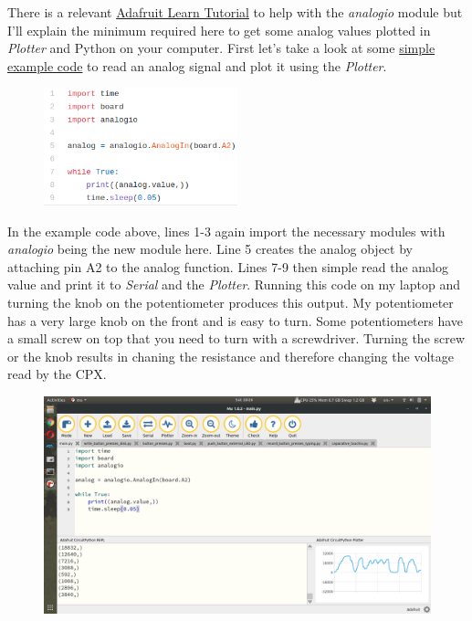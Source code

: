 There is a relevant \href{https://learn.adafruit.com/adafruit-circuit-playground-express/circuitpython-analog-in}{Adafruit Learn Tutorial} to help with the {\it analogio} module but I’ll explain the minimum required here to get some analog values plotted in {\it Plotter} and Python on your computer. First let’s take a look at some \href{https://github.com/cmontalvo251/Microcontrollers/blob/master/Circuit_Playground/CircuitPython/Analog/analog_simple.py}{simple example code} to read an analog signal and plot it using the {\it Plotter}.
\begin{figure}[H]
  \begin{center}
    \includegraphics[width=0.5\textwidth]{Figures/analogio.png}
  \end{center}
\end{figure}
In the example code above, lines 1-3 again import the necessary modules with {\it analogio} being the new module here. Line 5 creates the analog object by attaching pin A2 to the analog function. Lines 7-9 then simple read the analog value and print it to {\it Serial} and the {\it Plotter}. Running this code on my laptop and turning the knob on the potentiometer produces this output. My potentiometer has a very large knob on the front and is easy to turn. Some potentiometers have a small screw on top that you need to turn with a screwdriver. Turning the screw or the knob results in chaning the resistance and therefore changing the voltage read by the CPX.
\begin{figure}[H]
  \begin{center}
    \includegraphics[width=\textwidth]{Figures/analogio_mu.png}
  \end{center}
\end{figure}
